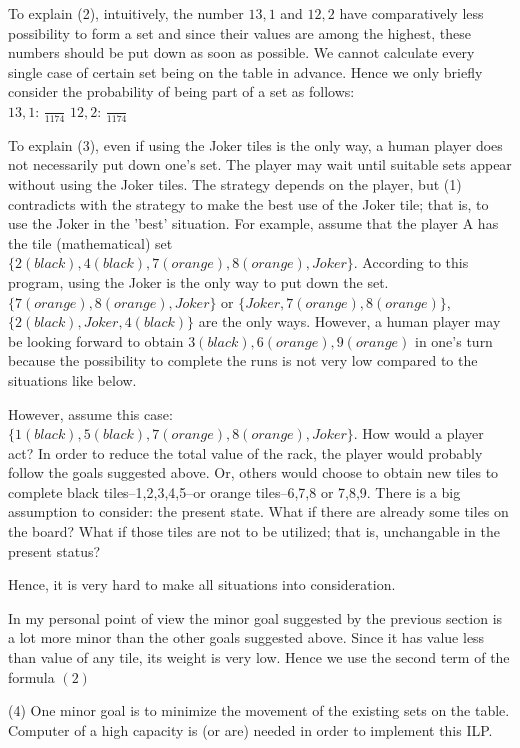 \documentclass[11pt]{article}
\begin{document}
	
	To explain (2), intuitively, the number $13,1$ and $12,2$ have comparatively less possibility to form a set and since their values are among the highest, these numbers should be put down as soon as possible. We cannot calculate every single case of certain set being on the table in advance. Hence we only briefly consider the probability of being part of a set as follows:\\
	$13,1$: $\frac{}{1174}$
	$12,2$: $\frac{}{1174}$
	
	
	To explain (3), even if using the Joker tiles is the only way, a human player does not necessarily put down one's set. The player may wait until suitable sets appear without using the Joker tiles. The strategy depends on the player, but (1) contradicts with the strategy to make the best use of the Joker tile; that is, to use the Joker in the 'best' situation. For example, assume that the player A has the tile (mathematical) set $\{2(black),4(black),7(orange),8(orange),Joker \}$. According to this program, using the Joker is the only way to put down the set. $\{7(orange), 8(orange), Joker\}$ or $\{Joker,7(orange), 8(orange) \}$, $\{2(black), Joker, 4(black) \}$ are the only ways. However, a human player may be looking forward to obtain $3(black), 6(orange), 9(orange)$ in one's turn because the possibility to complete the runs is not very low compared to the situations like below.
	
	
	However, assume this case: $\{1(black),5(black),7(orange),8(orange),Joker \}$. How would a player act? In order to reduce the total value of the rack, the player would probably follow the goals suggested above. Or, others would choose to obtain new tiles to complete black tiles--1,2,3,4,5--or orange tiles--6,7,8 or 7,8,9. There is a big assumption to consider: the present state. What if there are already some tiles on the board? What if those tiles are not to be utilized; that is, unchangable in the present status?
	
	
	Hence, it is very hard to make all situations into consideration.
	
	
	In my personal point of view the minor goal suggested by the previous section is a lot more minor than the other goals suggested above. Since it has value less than value of any tile, its weight is very low. Hence we use the second term of the formula $(2)$
	
	(4) One minor goal is to minimize the movement of the existing sets on the table.\\
	
	Computer of a high capacity is (or are) needed in order to implement this ILP.
	
	
	
\end{document}

